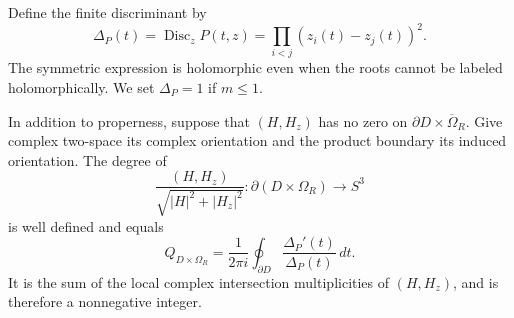 Define the finite discriminant by
\begin{equation}\label{f:discriminant-definition}
 \Delta_P(t)=\operatorname{Disc}_z P(t,z)
    =\prod_{i<j}(z_i(t)-z_j(t))^2.
\end{equation}
The symmetric expression is holomorphic even when the roots cannot be
labeled holomorphically.  We set $\Delta_P=1$ if $m\le1$.

\begin{theorem}
\label{f:charge-winding}\label{f:charge}
In addition to properness, suppose that $(H,H_z)$ has no zero on
$\partial D\times\overline\Omega_R$.  Give complex two-space its
complex orientation and the product boundary its induced orientation.
The degree of
\[
 \frac{(H,H_z)}{\sqrt{|H|^2+|H_z|^2}}:
       \partial(D\times\Omega_R)\longrightarrow S^3
\]
is well defined and equals
\begin{equation}\label{f:winding-formula}
 Q_{D\times\Omega_R}
   =\frac1{2\pi i}\oint_{\partial D}
              \frac{\Delta_P'(t)}{\Delta_P(t)}\,dt.
\end{equation}
It is the sum of the local complex intersection multiplicities of
$(H,H_z)$, and is therefore a nonnegative integer.
\end{theorem}

